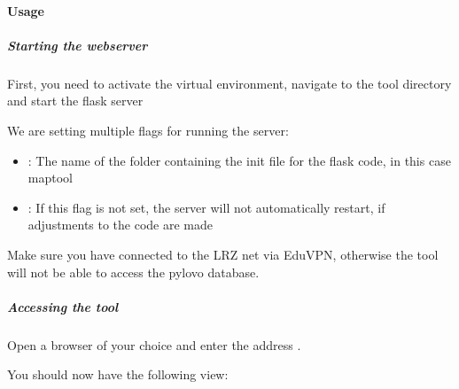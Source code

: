 \documentclass[letterpaper,10pt,english]{sphinxmanual}
\begin{document}
\paragraph{Usage}
\label{\detokenize{docs_gui/usage/usage:usage}}\label{\detokenize{docs_gui/usage/usage::doc}}

\subparagraph{Starting the webserver}
\label{\detokenize{docs_gui/usage/usage:starting-the-webserver}}
\sphinxAtStartPar
First, you need to activate the virtual environment, navigate to the tool directory and start the flask server

\begin{sphinxVerbatim}[commandchars=\\\{\}]
  
 
    
\end{sphinxVerbatim}

\sphinxAtStartPar
We are setting multiple flags for running the server:
\begin{itemize}
\item {} 
\sphinxAtStartPar
{}:  The name of the folder containing the init file for the flask code, in this case maptool

\item {} 
\sphinxAtStartPar
{}: If this flag is not set, the server will not automatically restart, if adjustments to the code are made

\end{itemize}

\sphinxAtStartPar
Make sure you have connected to the LRZ net via EduVPN, otherwise the tool will not be able to access the pylovo database.


\subparagraph{Accessing the tool}
\label{\detokenize{docs_gui/usage/usage:accessing-the-tool}}
\begin{DUlineblock}{0em}
\item[] Open a browser of your choice and enter the address .
\item[] You should now have the following view:
\end{DUlineblock}
\end{document}
